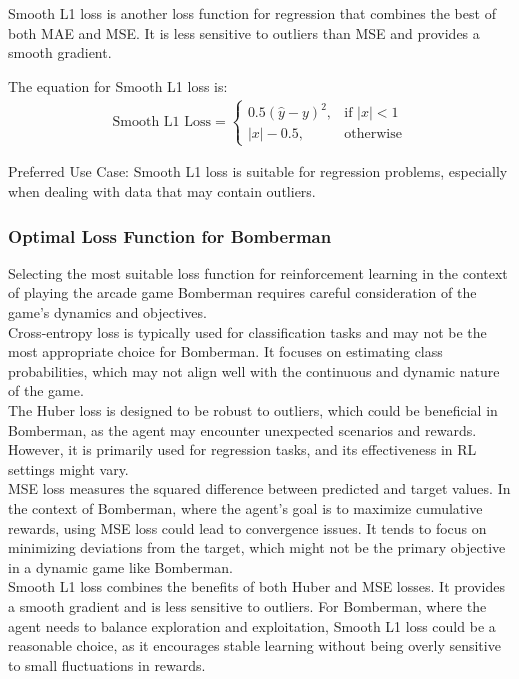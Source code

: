 Smooth L1 loss is another loss function for regression that combines the best of both MAE and MSE. It is less sensitive to outliers than MSE and provides a smooth gradient.

The equation for Smooth L1 loss is:
\begin{align}
	\text{Smooth L1 Loss} = \begin{cases}
		0.5(\hat{y} - y)^2, & \text{if } |x| < 1 \\
		|x| - 0.5, & \text{otherwise}
	\end{cases}    
\end{align}

Preferred Use Case: Smooth L1 loss is suitable for regression problems, especially when dealing with data that may contain outliers. \cite{smoothloss}

\subsubsection{Optimal Loss Function for Bomberman}

Selecting the most suitable loss function for reinforcement learning in the context of playing the arcade game Bomberman requires careful consideration of the game's dynamics and objectives.\\
Cross-entropy loss is typically used for classification tasks and may not be the most appropriate choice for Bomberman. It focuses on estimating class probabilities, which may not align well with the continuous and dynamic nature of the game. \\
The Huber loss is designed to be robust to outliers, which could be beneficial in Bomberman, as the agent may encounter unexpected scenarios and rewards. However, it is primarily used for regression tasks, and its effectiveness in RL settings might vary. \\
MSE loss measures the squared difference between predicted and target values. In the context of Bomberman, where the agent's goal is to maximize cumulative rewards, using MSE loss could lead to convergence issues. It tends to focus on minimizing deviations from the target, which might not be the primary objective in a dynamic game like Bomberman. \\
Smooth L1 loss combines the benefits of both Huber and MSE losses. It provides a smooth gradient and is less sensitive to outliers. For Bomberman, where the agent needs to balance exploration and exploitation, Smooth L1 loss could be a reasonable choice, as it encourages stable learning without being overly sensitive to small fluctuations in rewards.

